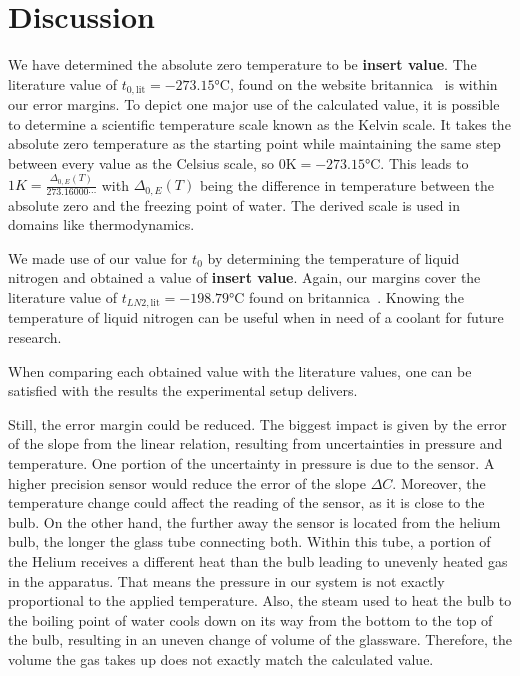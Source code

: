 \section{Discussion}
    We have determined the absolute zero temperature to be \textbf{insert value}.
    The literature value of $t_{0, \text{lit}} = -273.15 \si{\celsius}$, found on the website britannica~\cite{literature_absolute_zero} is within our error margins.
    To depict one major use of the calculated value, it is possible to determine a scientific temperature scale known as the Kelvin scale.
    It takes the absolute zero temperature as the starting point while maintaining the same step between every value as the Celsius scale, so $0 \si{\kelvin} = -273.15 \si{\celsius}$.
    This leads to $1K = \frac{\Delta_{0, E}(T)}{273.16000\cdots}$ with $\Delta_{0, E}(T)$ being the difference in temperature between the absolute zero and the freezing point of water.
    The derived scale is used in domains like thermodynamics.

    We made use of our value for $t_0$ by determining the temperature of liquid nitrogen and obtained a value of \textbf{insert value}.
    Again, our margins cover the literature value of $t_{LN2, \text{lit}} = -198.79 \si{\celsius}$ found on britannica~\cite{literature_liquid_nitrogen}.
    Knowing the temperature of liquid nitrogen can be useful when in need of a coolant for future research.

    When comparing each obtained value with the literature values, one can be satisfied with the results the experimental setup delivers.

    Still, the error margin could be reduced.
    The biggest impact is given by the error of the slope from the linear relation, resulting from uncertainties in pressure and temperature.
    One portion of the uncertainty in pressure is due to the sensor.
    A higher precision sensor would reduce the error of the slope $\Delta C$.
    Moreover, the temperature change could affect the reading of the sensor, as it is close to the bulb.
    On the other hand, the further away the sensor is located from the helium bulb, the longer the glass tube connecting both.
    Within this tube, a portion of the Helium receives a different heat than the bulb leading to unevenly heated gas in the apparatus.
    That means the pressure in our system is not exactly proportional to the applied temperature.
    Also, the steam used to heat the bulb to the boiling point of water cools down on its way from the bottom to the top of the bulb, resulting in an uneven change of volume of the glassware.
    Therefore, the volume the gas takes up does not exactly match the calculated value.

